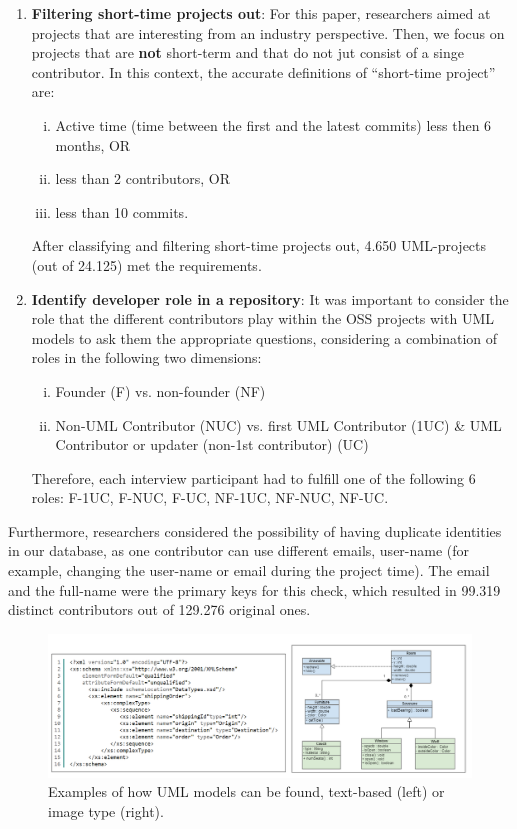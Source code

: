 \documentclass[a4paper, 12pt]{book}
\begin{document}
\begin{enumerate}
  \item \textbf{Filtering short-time projects out}: For this paper, researchers aimed
  at projects that are interesting from an industry perspective. Then, we focus on projects that are \textbf{not} short-term and that
  do not jut consist of a singe contributor. In this context, the accurate definitions of ``short-time project'' are:
  \begin{enumerate}[i.]
    \item Active time (time between the first and the latest commits) less then 6 months, OR
    \item less than 2 contributors, OR
    \item less than 10 commits.
  \end{enumerate}
  After classifying and filtering short-time projects out, 4.650 UML-projects (out of 24.125) met the requirements.
  \item \textbf{Identify developer role in a repository}: It was important to consider the role that the different contributors
  play within the OSS projects with UML models to ask them the appropriate questions, considering a combination of roles in the
  following two dimensions:
  \begin{enumerate}[i.]
    \item Founder (F) vs. non-founder (NF)
    \item Non-UML Contributor (NUC) vs. first UML Contributor (1UC) \& UML Contributor or updater (non-1st contributor) (UC)
  \end{enumerate}
  Therefore, each interview participant had to fulfill one of the following 6 roles: F-1UC, F-NUC, F-UC, NF-1UC, NF-NUC, NF-UC.
\end{enumerate}
Furthermore, researchers considered the possibility of having duplicate identities in our database, as one contributor can
use different emails, user-name (for example, changing the user-name or email during the project time).
The email and the full-name were the primary keys for this check, which resulted in 99.319 distinct contributors out of
129.276 original ones.
 \begin{figure}
   \centering
   \includegraphics[width=15cm, keepaspectratio]{img/umls-landscape}
   \caption{Examples of how UML models can be found, text-based (left) or image type (right).}
   \label{fig:uml-types}
 \end{figure}
\end{document}
